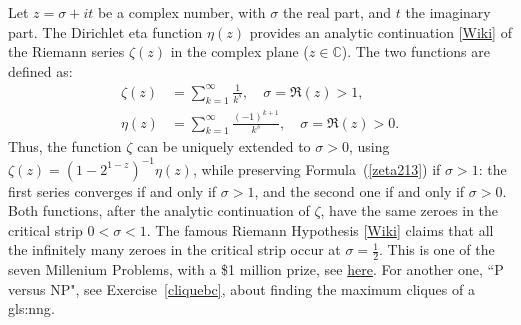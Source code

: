 \documentclass[10pt]{article}
\begin{document}
Let $z=\sigma+it$ be a complex number, with $\sigma$ the real part, and $t$ the imaginary part. The Dirichlet eta function $\eta(z)$ provides an analytic continuation [\href{https://en.wikipedia.org/wiki/Analytic_continuation}{Wiki}] of the Riemann  series $\zeta(z)$ in the complex plane ($z\in\mathbb{C}$). The two functions are defined as:
\begin{align}
\zeta(z) & = \sum_{k=1}^\infty \frac{1}{k^s}, \quad \sigma =\Re(z) > 1, \label{zeta213} \\
\eta(z) & = \sum_{k=1}^\infty \frac{(-1)^{k+1}}{k^s}, \quad \sigma =\Re(z) > 0. \label{zeta214}
\end{align}
Thus, the function $\zeta$ can be uniquely extended to $\sigma>0$, using $\zeta(z)=(1-2^{1-z})^{-1}\eta(z)$, while preserving
Formula~(\ref{zeta213}) if $\sigma>1$: the first series converges if and only if $\sigma>1$, and the second one if and only if $\sigma>0$.
Both functions, after the analytic continuation of $\zeta$, have the same zeroes in the critical strip $0<\sigma<1$. The famous Riemann Hypothesis [\href{https://en.wikipedia.org/wiki/Riemann_hypothesis}{Wiki}]
claims that all the infinitely many zeroes in the critical strip occur at $\sigma=\frac{1}{2}$. This is one of the seven Millenium Problems, with a \$1 million
prize, see \href{https://www.claymath.org/millennium-problems/riemann-hypothesis}{here}. For another one, ``P versus NP", see 
Exercise~\ref{cliquebc}, about finding the maximum cliques of a \gls{gls:nng}.
\end{document}
